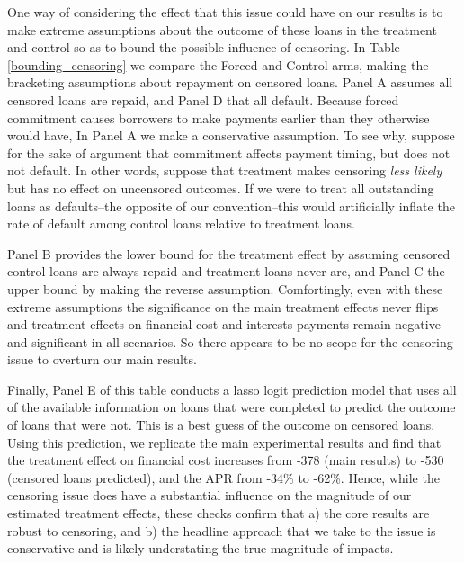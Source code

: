 One way of considering the effect that this issue could have on our results is to make extreme assumptions about the outcome of these loans in the treatment and control so as to bound the possible influence of censoring.  In Table \ref{bounding_censoring} we compare the Forced and Control arms, making the bracketing assumptions about repayment on censored loans.  Panel A assumes all censored loans are repaid, and Panel D that all default. Because forced commitment causes borrowers to make payments earlier than they otherwise would have, In Panel A we make a conservative assumption. To see why, suppose for the sake of argument that commitment affects payment timing, but does not not default.
In other words, suppose that treatment makes censoring \emph{less likely} but has no effect on uncensored outcomes. 
If we were to treat all outstanding loans as defaults--the opposite of our convention--this would artificially inflate the rate of default among control loans relative to treatment loans.

Panel B provides the lower bound for the treatment effect by assuming censored control loans are always repaid and treatment loans never are, and Panel C the upper bound by making the reverse assumption.  Comfortingly, even with these extreme assumptions the significance on the main treatment effects never flips and treatment effects on financial cost and interests payments remain negative and significant in all scenarios.  So there appears to be no scope for the censoring issue to overturn our main results. 



Finally, Panel E of this table conducts a lasso logit prediction model that uses all of the available information on loans that were completed to predict the outcome of loans that were not.  This is a best guess of the outcome on censored loans.  Using this prediction, we replicate the main experimental results and find that the treatment effect on financial cost increases from -378 (main results) to -530 (censored loans predicted), and the APR from -34\% to -62\%.  Hence, while the censoring issue does have a substantial influence on the magnitude of our estimated treatment effects, these  checks confirm that a) the core results are robust to censoring, and b) the headline approach that we take to the issue is conservative and is likely understating the true magnitude of impacts.

